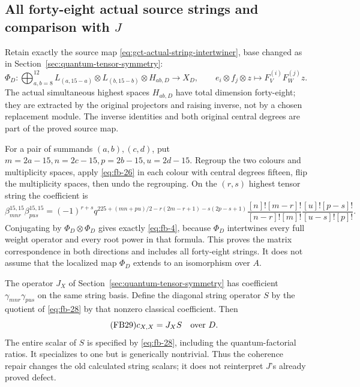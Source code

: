 \subsection{All forty-eight actual source strings and comparison with $J$}
\label{sec:fb-strings}

Retain exactly the source map
\eqref{eq:gct-actual-string-intertwiner}, base changed as in
Section~\ref{sec:quantum-tensor-symmetry}:
\begin{equation}\tag{FB27}\label{eq:fb-27}
\Phi_D:\bigoplus_{a,b=8}^{12}
 L_{(a,15-a)}\otimes L_{(b,15-b)}\otimes H_{ab,D}
 \longrightarrow X_D,\qquad
 e_i\otimes f_j\otimes z\longmapsto F_V^{(i)}F_W^{(j)}z.
\end{equation}
The actual simultaneous highest spaces \(H_{ab,D}\) have total dimension
forty-eight; they are extracted by the original projectors and raising
inverse, not by a chosen replacement module. The inverse identities
and both original central degrees are part of the proved source map.

For a pair of summands \((a,b),(c,d)\), put
\(m=2a-15,n=2c-15,p=2b-15,u=2d-15\). Regroup the two colours and
multiplicity spaces, apply \eqref{eq:fb-26} in each colour with central degrees
fifteen, flip the multiplicity spaces, then undo the regrouping.
On the \((r,s)\) highest tensor string the coefficient is
\begin{equation}\tag{FB28}\label{eq:fb-28}
\beta_{mnr}^{15,15}\beta_{pus}^{15,15}
 =(-1)^{r+s}q^{225+(mn+pu)/2-r(2m-r+1)-s(2p-s+1)}
 \frac{[n]![m-r]!}{[n-r]![m]!}
 \frac{[u]![p-s]!}{[u-s]![p]!}.
\end{equation}
Conjugating by \(\Phi_D\otimes\Phi_D\) gives exactly \eqref{eq:fb-4}, because
\(\Phi_D\) intertwines every full weight operator and every root power
in that formula. This proves the matrix correspondence in both
directions and includes all forty-eight strings. It does not assume
that the localized map \(\Phi_D\) extends to an isomorphism over \(A\).

The operator \(J_X\) of
Section~\ref{sec:quantum-tensor-symmetry} has coefficient \(\gamma_{mnr}\gamma_{pus}\) on the
same string basis. Define the diagonal string operator \(S\) by the
quotient of \eqref{eq:fb-28} by that nonzero classical coefficient. Then
\begin{equation}\tag{FB29}\label{eq:fb-29}
c_{X,X}=J_XS\quad\hbox{over }D.
\end{equation}
The entire scalar of \(S\) is specified by \eqref{eq:fb-28}, including the
quantum-factorial ratios. It specializes to one but is generically
nontrivial. Thus the coherence repair changes the old calculated
string scalars; it does not reinterpret \(J\)'s already proved defect.

